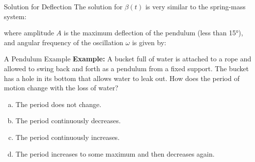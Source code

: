 \documentclass[12pt,compress,aspectratio=169]{beamer}
\newcommand{\eq}[2]{\vspace{#1}{\Large\begin{displaymath}#2\end{displaymath}}}
\begin{document}
\begin{frame}{Solution for Deflection}
  The solution for $\beta(t)$ is very similar to the spring-mass system:

    \eq{-.2in}{
      \boxed{\beta(t)=A\cos(\omega t-\phi)}
    }

    where amplitude $A$ is the maximum deflection of the pendulum (less than
    \ang{15}), and angular frequency of the oscillation $\omega$ is given by:
    
    \eq{-.15in}{
      \boxed{\omega=\sqrt{\frac{g}{L}}}
    }
\end{frame}






\begin{frame}{A Pendulum Example}
  \textbf{Example:} A bucket full of water is attached to a rope and allowed
  to swing back and forth as a pendulum from a fixed support. The bucket has a
  hole in its bottom that allows water to leak out. How does the period of
  motion change with the loss of water?
  \begin{enumerate}[(a)]
  \item The period does not change.
  \item The period continuously decreases.
  \item The period continuously increases.
  \item The period increases to some maximum and then decreases again.
  \end{enumerate}
\end{frame}
\end{document}
